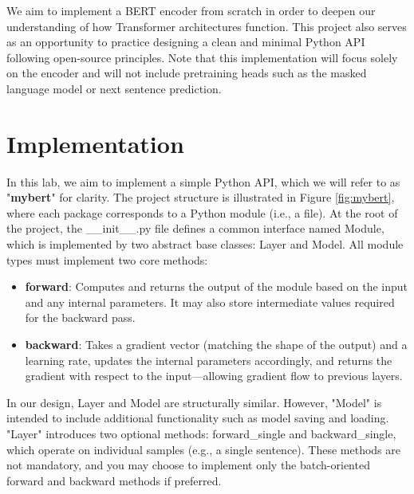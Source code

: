 \documentclass{../../../extra/aakpract/aakpract}
\begin{document}
\maketitle

\begin{center}
	\begin{minipage}{0.8\textwidth}
		\small
		We aim to implement a BERT encoder from scratch in order to deepen our understanding of how Transformer architectures function. 
		This project also serves as an opportunity to practice designing a clean and minimal Python API following open-source principles. 
		Note that this implementation will focus solely on the encoder and will not include pretraining heads such as the masked language model or next sentence prediction.
	\end{minipage}
\end{center}

\section{Implementation}

In this lab, we aim to implement a simple Python API, which we will refer to as "\textbf{mybert}" for clarity. 
The project structure is illustrated in Figure \ref{fig:mybert}, where each package corresponds to a Python module (i.e., a file). 
At the root of the project, the \_\_init\_\_.py file defines a common interface named Module, which is implemented by two abstract base classes: Layer and Model.
All module types must implement two core methods:
\begin{itemize}
	\item \textbf{forward}: Computes and returns the output of the module based on the input and any internal parameters. It may also store intermediate values required for the backward pass.
	\item \textbf{backward}: Takes a gradient vector (matching the shape of the output) and a learning rate, updates the internal parameters accordingly, and returns the gradient with respect to the input—allowing gradient flow to previous layers.
\end{itemize}

In our design, Layer and Model are structurally similar. 
However, "Model" is intended to include additional functionality such as model saving and loading.
"Layer" introduces two optional methods: forward\_single and backward\_single, which operate on individual samples (e.g., a single sentence). 
These methods are not mandatory, and you may choose to implement only the batch-oriented forward and backward methods if preferred.
\end{document}
